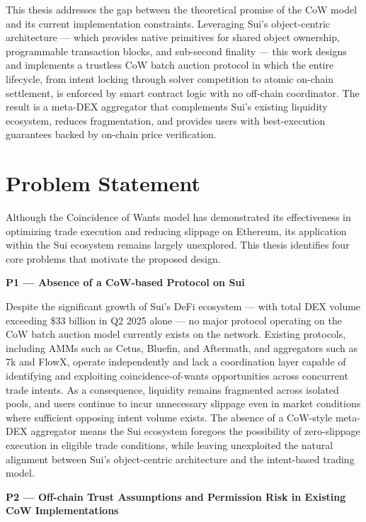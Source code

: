 This thesis addresses the gap between the theoretical promise of the CoW model and its current implementation constraints. Leveraging Sui's object-centric architecture — which provides native primitives for shared object ownership, programmable transaction blocks, and sub-second finality — this work designs and implements a trustless CoW batch auction protocol in which the entire lifecycle, from intent locking through solver competition to atomic on-chain settlement, is enforced by smart contract logic with no off-chain coordinator. The result is a meta-DEX aggregator that complements Sui's existing liquidity ecosystem, reduces fragmentation, and provides users with best-execution guarantees backed by on-chain price verification.

\section{Problem Statement}

Although the Coincidence of Wants model has demonstrated its effectiveness in optimizing trade execution and reducing slippage on Ethereum, its application within the Sui ecosystem remains largely unexplored. This thesis identifies four core problems that motivate the proposed design.

\textbf{P1 --- Absence of a CoW-based Protocol on Sui}

Despite the significant growth of Sui's DeFi ecosystem --- with total DEX volume exceeding \$33 billion in Q2 2025 alone \cite{SuiQ220252025} --- no major protocol operating on the CoW batch auction model currently exists on the network. Existing protocols, including AMMs such as Cetus, Bluefin, and Aftermath, and aggregators such as 7k and FlowX, operate independently and lack a coordination layer capable of identifying and exploiting coincidence-of-wants opportunities across concurrent trade intents. As a consequence, liquidity remains fragmented across isolated pools, and users continue to incur unnecessary slippage even in market conditions where sufficient opposing intent volume exists. The absence of a CoW-style meta-DEX aggregator means the Sui ecosystem foregoes the possibility of zero-slippage execution in eligible trade conditions, while leaving unexploited the natural alignment between Sui's object-centric architecture and the intent-based trading model.

\textbf{P2 --- Off-chain Trust Assumptions and Permission Risk in Existing CoW Implementations}

